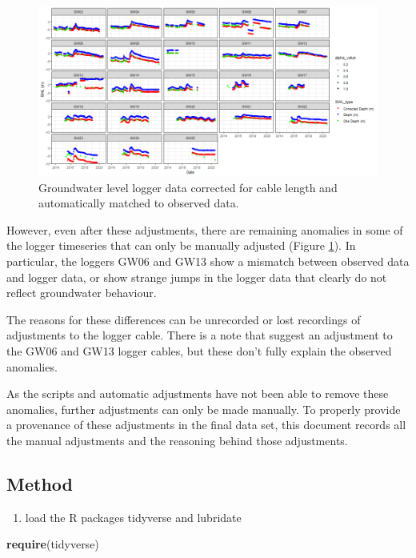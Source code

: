 \documentclass[
]{article}
\newenvironment{Shaded}{\begin{snugshade}}{\end{snugshade}}
\newcommand{\FunctionTok}[1]{\textcolor[rgb]{0.13,0.29,0.53}{\textbf{#1}}}
\newcommand{\NormalTok}[1]{#1}
\providecommand{\tightlist}{%
  \setlength{\itemsep}{0pt}\setlength{\parskip}{0pt}}
\begin{document}
\begin{figure}
\includegraphics[width=0.95\linewidth]{../Figures/Corrected_piezodepths} \caption{Groundwater level logger data corrected for cable length and automatically matched to observed data.}\label{fig:piezodata}
\end{figure}

However, even after these adjustments, there are remaining anomalies in
some of the logger timeseries that can only be manually adjusted (Figure
\ref{fig:piezodata}). In particular, the loggers GW06 and GW13 show a
mismatch between observed data and logger data, or show strange jumps in
the logger data that clearly do not reflect groundwater behaviour.

The reasons for these differences can be unrecorded or lost recordings
of adjustments to the logger cable. There is a note that suggest an
adjustment to the GW06 and GW13 logger cables, but these don't fully
explain the observed anomalies.

As the scripts and automatic adjustments have not been able to remove
these anomalies, further adjustments can only be made manually. To
properly provide a provenance of these adjustments in the final data
set, this document records all the manual adjustments and the reasoning
behind those adjustments.

\subsection{Method}\label{method}

\begin{enumerate}
\def\labelenumi{\arabic{enumi}.}
\tightlist
\item
  load the R packages tidyverse and lubridate
\end{enumerate}

\begin{Shaded}
\begin{Highlighting}[]
\FunctionTok{require}\NormalTok{(tidyverse)}
\end{Highlighting}
\end{Shaded}
\end{document}
